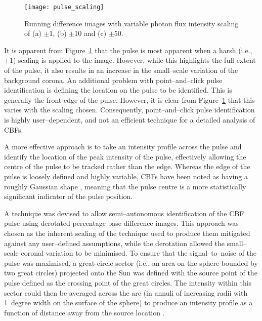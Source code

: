 \begin{figure}[!t]
\begin{center}
\texttt{[image: pulse\_scaling]}
\caption{Running difference images with variable photon flux intensity scaling of (a) $\pm$1, (b) $\pm$10 and (c) $\pm$50.}
\label{fig:pulse_scaling}
\end{center}
\end{figure}

It is apparent from Figure~\ref{fig:pulse_scaling} that the pulse is most apparent when a harsh (i.e., $\pm1$) scaling is applied to the image. However, while this highlights the full extent of the pulse, it also results in an increase in the small--scale variation of the background corona. An additional problem with point--and--click pulse identification is defining the location on the pulse to be identified. This is generally the front edge of the pulse. However, it is clear from Figure~\ref{fig:pulse_scaling} that this varies with the scaling chosen. Consequently, point--and--click pulse identification is highly user--dependent, and not an efficient technique for a detailed analysis of CBFs. 

A more effective approach is to take an intensity profile across the pulse and identify the location of the peak intensity of the pulse, effectively allowing the centre of the pulse to be tracked rather than the edge. Whereas the edge of the pulse is loosely defined and highly variable, CBFs have been noted as having a roughly Gaussian shape \citep{Wills-Davey:1999ve}, meaning that the pulse centre is a more statistically significant indicator of the pulse position.

A technique was devised to allow semi--autonomous identification of the CBF pulse using derotated percentage base difference images. This approach was chosen as the inherent scaling of the technique used to produce them mitigated against any user--defined assumptions, while the derotation allowed the small--scale coronal variation to be minimised. To ensure that the signal--to--noise of the pulse was maximised, a great-circle sector (i.e., an area on the sphere bounded by two great circles) projected onto the Sun was defined with the source point of the pulse defined as the crossing point of the great circles. The intensity within this sector could then be averaged across the arc (in annuli of increasing radii with 1~degree width on the surface of the sphere) to produce an intensity profile as a function of distance away from the source location \citep[cf. similar techniques proposed by][]{Warmuth:2004ab,Podladchikova:2005ab,Wills-Davey:2006ab,Veronig:2010ab}.

